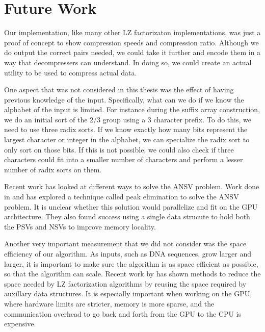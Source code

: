 \chapter{Future Work}
\label{chap:futurework}

Our implementation, like many other LZ factorizaton implementations, was just a proof of concept to show compression speeds and compression ratio.
Although we do output the correct pairs needed, we could take it further and encode them in a way that decompressers can understand.
In doing so, we could create an actual utility to be used to compress actual data.

One aspect that was not considered in this thesis was the effect of having previous knowledge of the input.
Specifically, what can we do if we know the alphabet of the input is limited.
For instance during the suffix array construction, we do an initial sort of the 2/3 group using a 3 character prefix.
To do this, we need to use three radix sorts.
If we know exactly how many bits represent the largest character or integer in the alphabet, we can specialize the radix sort to only sort on those bits.
If this is not possible, we could also check if three characters could fit into a smaller number of characters and perform a lesser number of radix sorts on them.

Recent work has looked at different ways to solve the ANSV problem.
Work done in \cite{Computing longest previous factor in linear time and applications} and \cite{Simpler and Faster Lempel Ziv Factorization} has explored a technique called peak elimination to solve the ANSV problem.
It is unclear whether this solution would parallelize and fit on the GPU architecture.
They also found success using a single data strucute to hold both the PSVs and NSVs to improve memory locality.

Another very important measurement that we did not consider was the space efficiency of our algorithm.
As inputs, such as DNA sequences, grow larger and larger, it is important to make sure the algorithm is as space efficient as possible, so that the algorithm can scale.
Recent work by \cite{Space Efﬁcient Linear Time Lempel-Ziv Factorization on Constant Size Alphabets} has shown methods to reduce the space needed by LZ factorization algorithms by reusing the space required by auxillary data structures.
It is especially important when working on the GPU, where hardware limits are stricter, memory is more sparse, and the communication overhead to go back and forth from the GPU to the CPU is expensive.

